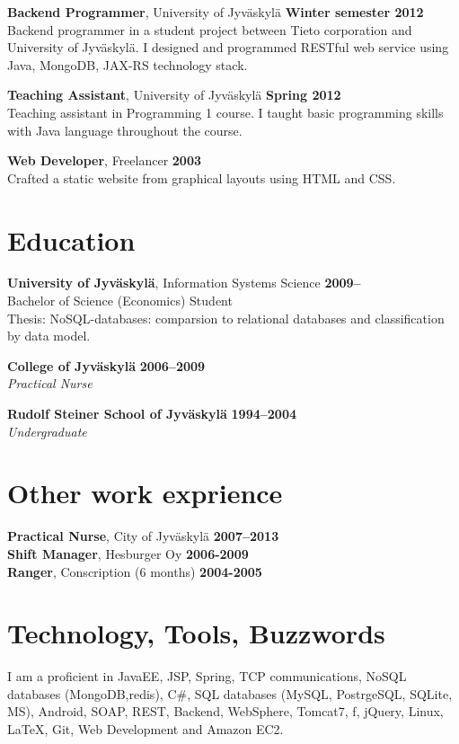 \documentclass[margin,line]{resume}
\begin{document}
\begin{resume}
\textbf{Backend Programmer}, University of Jyväskylä 
\hfill\textbf{Winter semester 2012}\\
Backend programmer in a student project between Tieto corporation and University of Jyväskylä. I designed and programmed RESTful web service using Java, MongoDB, JAX-RS technology stack.
    
\textbf{Teaching Assistant}, University of Jyväskylä  
\hfill\textbf{Spring 2012}\\
Teaching assistant in Programming 1 course. I taught basic programming skills with Java language throughout the course.

\textbf{Web Developer}, Freelancer
\hfill\textbf{2003}\\
Crafted a static website from graphical layouts using HTML and CSS.

\section{\mysidestyle Education}

\textbf{University of Jyväskylä}, Information Systems Science \hfill \textbf{2009--} \\
Bachelor of Science (Economics) Student \\
Thesis: NoSQL-databases: comparsion to relational databases and classification by data model.

\textbf{College of Jyväskylä} \hfill \textbf{ 2006--2009}\\
\textsl{Practical Nurse} 

\textbf{Rudolf Steiner School of Jyväskylä} \hfill \textbf{1994--2004}\\
\textsl{Undergraduate} 

\section{\mysidestyle Other work exprience}
\textbf{Practical Nurse}, City of Jyväskylä \hfill\textbf{2007--2013}\\
\textbf{Shift Manager}, Hesburger Oy \hfill\textbf{2006-2009}\\
\textbf{Ranger}, Conscription (6 months) \hfill\textbf{2004-2005} 

\section{\mysidestyle Technology, Tools, Buzzwords} 

I am a proficient in JavaEE, JSP, Spring, TCP communications, NoSQL databases (MongoDB,redis), C\#, SQL databases (MySQL, PostrgeSQL, SQLite, MS), Android, SOAP, REST, Backend, WebSphere, Tomcat7, f, jQuery, Linux, LaTeX, Git, Web Development and Amazon EC2.


\end{resume}
\end{document}
